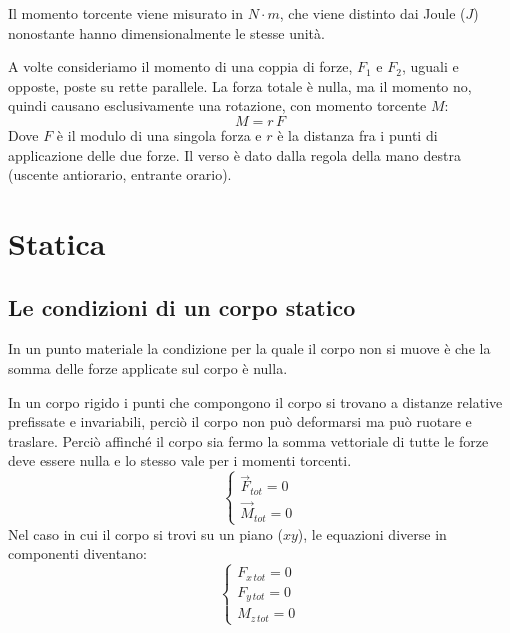 \documentclass{article}
\begin{document}
Il momento torcente viene misurato in $N \cdot m$, che viene distinto dai Joule ($J$) nonostante hanno dimensionalmente le stesse unità.


A volte consideriamo il momento di una coppia di forze, $F_1$ e $F_2$, uguali e opposte, poste su rette parallele. La forza totale è nulla, ma il momento no, quindi causano esclusivamente una rotazione, con momento torcente $M$:
\begin{equation}
    M=r \, F
\end{equation}
Dove $F$ è il modulo di una singola forza e $r$ è la distanza fra i punti di applicazione delle due forze. Il verso è dato dalla regola della mano destra (uscente antiorario, entrante orario).

\section{Statica}
\subsection{Le condizioni di un corpo statico}
In un punto materiale la condizione per la quale il corpo non si muove è che la somma delle forze applicate sul corpo è nulla.

In un corpo rigido i punti che compongono il corpo si trovano a distanze relative prefissate e invariabili, perciò il corpo non può deformarsi ma può ruotare e traslare. Perciò affinché il corpo sia fermo la somma vettoriale di tutte le forze deve essere nulla e lo stesso vale per i momenti torcenti.
\begin{equation}
    \begin{cases}
        \Vec{F}_{tot}=0\\
        \Vec{M}_{tot}=0
    \end{cases}
\end{equation}
Nel caso in cui il corpo si trovi su un piano ($xy$), le equazioni diverse in componenti diventano:
\begin{equation}
    \begin{cases}
        F_{x\,tot}=0\\
        F_{y\,tot}=0\\
        M_{z\,tot}=0
    \end{cases}
\end{equation}
\end{document}
